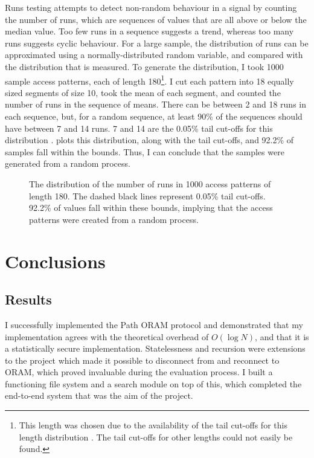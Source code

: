 \documentclass[12pt,a4paper,twoside,openright]{report}
\begin{document}
Runs testing attempts to detect non-random behaviour in a signal by counting the number of runs, which are sequences of values that are all above or below the median value. Too few runs in a sequence suggests a trend, whereas too many runs suggests cyclic behaviour. For a large sample, the distribution of runs can be approximated using a normally-distributed random variable, and compared with the distribution that is measured. To generate the distribution, I took 1000 sample access patterns, each of length 180\footnote{This length was chosen due to the availability of the tail cut-offs for this length distribution \cite{masliah2000stationarity}. The tail cut-offs for other lengths could not easily be found.}. I cut each pattern into 18 equally sized segments of size 10, took the mean of each segment, and counted the number of runs in the sequence of means. There can be between 2 and 18 runs in each sequence, but, for a random sequence, at least 90\% of the sequences should have between 7 and 14 runs. 7 and 14 are the 0.05\% tail cut-offs for this distribution \cite{masliah2000stationarity}.  plots this distribution, along with the tail cut-offs, and 92.2\% of samples fall within the bounds. Thus, I can conclude that the samples were generated from a random process.

\begin{figure}
    \centering
    
    \caption{The distribution of the number of runs in 1000 access patterns of length 180. The dashed black lines represent 0.05\% tail cut-offs. 92.2\% of values fall within these bounds, implying that the access patterns were created from a random process.}
    \label{fig:runsTestPlot}
\end{figure}

\chapter{Conclusions}

\section{Results}

I successfully implemented the Path ORAM protocol and demonstrated that my implementation agrees with the theoretical overhead of $O(\log N)$, and that it is a statistically secure implementation. Statelessness and recursion were extensions to the project which made it possible to disconnect from and reconnect to ORAM, which proved invaluable during the evaluation process. I built a functioning file system and a search module on top of this, which completed the end-to-end system that was the aim of the project.
\end{document}
